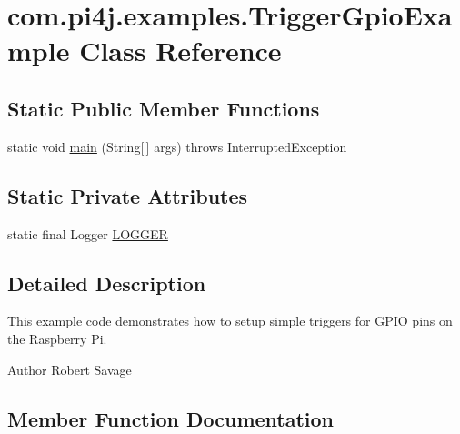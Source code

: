 \hypertarget{classcom_1_1pi4j_1_1examples_1_1TriggerGpioExample}{}\section{com.\+pi4j.\+examples.\+Trigger\+Gpio\+Example Class Reference}
\label{classcom_1_1pi4j_1_1examples_1_1TriggerGpioExample}
\subsection*{Static Public Member Functions}
\begin{DoxyCompactItemize}
\item 
static void \hyperlink{classcom_1_1pi4j_1_1examples_1_1TriggerGpioExample_ad286827e1917615f5f1ec8170f17d114}{main} (String\mbox{[}$\,$\mbox{]} args)  throws Interrupted\+Exception 
\end{DoxyCompactItemize}
\subsection*{Static Private Attributes}
\begin{DoxyCompactItemize}
\item 
static final Logger \hyperlink{classcom_1_1pi4j_1_1examples_1_1TriggerGpioExample_ab2cd00493648e1d0e4e7d6c42be75449}{L\+O\+G\+G\+E\+R}
\end{DoxyCompactItemize}


\subsection{Detailed Description}
This example code demonstrates how to setup simple triggers for G\+P\+I\+O pins on the Raspberry Pi.

\begin{DoxyAuthor}{Author}
Robert Savage 
\end{DoxyAuthor}


\subsection{Member Function Documentation}
\hypertarget{classcom_1_1pi4j_1_1examples_1_1TriggerGpioExample_ad286827e1917615f5f1ec8170f17d114}{}
